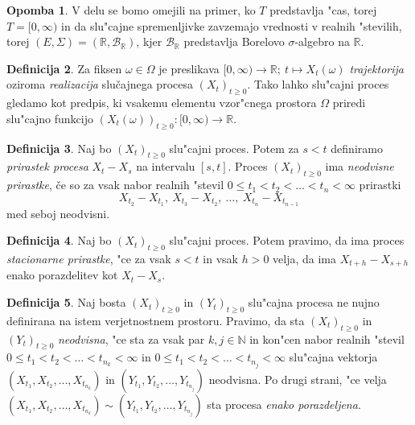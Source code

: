 \documentclass[12pt, a4paper, reqno]{amsart}
\theoremstyle{definition}
\newtheorem{definicija}{Definicija}[section]
\newtheorem{opomba}[definicija]{Opomba}
\theoremstyle{plain}
\newcommand{\R}{\mathbb{R}}
\newcommand{\N}{\mathbb{N}}
\newcommand{\B}{\mathcal{B}}
\newcommand{\1}{\mathds{1}}
\begin{document}
    \begin{opomba}
        V delu se bomo omejili na primer, ko $T$ predstavlja "cas, torej $T = [0, \infty)$ in da slu"cajne
        spremenljivke 
        zavzemajo vrednosti v realnih "stevilih, torej $(E, \Sigma) = (\R, \B_{\R})$, kjer $\B_\R$ 
        predstavlja Borelovo $\sigma$-algebro na $\R$.
        \label{op:Konvencije}
    \end{opomba}


    \begin{definicija}
        Za fiksen $\omega \in \Omega$ je preslikava 
        $[0, \infty) \rightarrow \mathbb{R}; \ t \mapsto X_t(\omega)$ 
        \textit{trajektorija} oziroma \textit{realizacija} slučajnega procesa $(X_t)_{t\geq0}$.
        Tako lahko slu"cajni proces gledamo kot predpis, ki vsakemu elementu vzor"cnega prostora 
        $\Omega$ priredi slu"cajno funkcijo
        $(X_t(\omega))_{t\geq0}: [0, \infty) \rightarrow \mathbb{R}$.
        \label{def:realizac}
    \end{definicija}

    \begin{definicija}
        Naj bo $(X_t)_{t\geq0}$ slu"cajni proces. Potem za $s < t$ definiramo
        \textit{prirastek procesa} $X_t - X_s$ na intervalu $[s, t]$. Proces $(X_t)_{t\geq0}$ ima 
        \textit{neodvisne prirastke}, če so za vsak nabor realnih "stevil
        $0 \leq t_1 < t_2 < \ldots < t_n < \infty$ prirastki
        $$
            X_{t_2} - X_{t_1}, \ X_{t_3} - X_{t_2}, \ \ldots, \ X_{t_n} - X_{t_{n-1}}
        $$
        med seboj neodvisni.
        \label{def:prirastek}
    \end{definicija}

    \begin{definicija}
        Naj bo $(X_t)_{t\geq0}$ slu"cajni proces. Potem pravimo, da ima proces
        \textit{stacionarne prirastke}, "ce za vsak $s < t$ in vsak $h > 0$ velja, 
        da ima $X_{t+h} - X_{s+h}$ enako porazdelitev kot $X_t - X_s$.
        \label{def:stacPrir}
    \end{definicija}

    \begin{definicija}
        Naj bosta $(X_t)_{t\geq0}$ in $(Y_t)_{t\geq0}$ slu"cajna procesa ne nujno definirana na istem 
        verjetnostnem prostoru. Pravimo, da sta $(X_t)_{t\geq0}$ in $(Y_t)_{t\geq0}$ \textit{neodvisna}, 
        "ce sta za vsak par $k,j \in \N$ in kon"cen nabor realnih "stevil $0 \leq t_1 < t_2 < \ldots < t_{n_k} < \infty$ in 
        $0 \leq t_1 < t_2 < \ldots < t_{n_j} < \infty$ slu"cajna 
        vektorja $(X_{t_1}, X_{t_2}, \ldots, X_{t_{n_k}})$ in $(Y_{t_1}, Y_{t_2}, \ldots, Y_{t_{n_j}})$ neodvisna.
        Po drugi strani, "ce velja $(X_{t_1}, X_{t_2}, \ldots, X_{t_{n_k}}) \sim (Y_{t_1}, Y_{t_2}, \ldots, Y_{t_{n_j}})$
        sta procesa \textit{enako porazdeljena}.
        \label{def:neodvisnostSP}
    \end{definicija}
\end{document}
